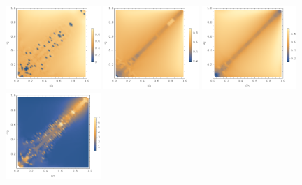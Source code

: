 \documentclass[%
reprint,
superscriptaddress,
amsmath,amssymb,
aps,
prd,
floatfix,
nofootinbib
]{revtex4-1}
\begin{document}



\begin{figure}
  \centering
    \includegraphics[width=0.32\textwidth]{plot/energy-ratio-axion-1d.png}
    \includegraphics[width=0.32\textwidth]{plot/energy-ratio-axion-2d.png}
    \includegraphics[width=0.32\textwidth]{plot/energy-ratio-axion-3d.png} \\\vskip-5pt
    \includegraphics[width=0.32\textwidth]{plot/r_max-axion-1d.png}

\end{figure}
\end{document}
